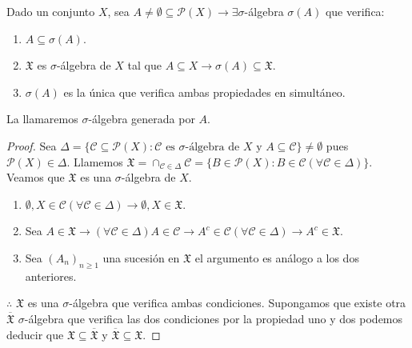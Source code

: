 \begin{prop}
    Dado un conjunto $X$, sea $A \neq \emptyset \subseteq \mathcal{P}(X) \to \exists \sigma$-álgebra $\sigma(A)$ que verifica: \begin{enumerate}
        \item $A \subseteq \sigma(A)$.
        \item $\mathfrak{X}$ es $\sigma$-álgebra de $X$ tal que $A \subseteq X \to \sigma(A) \subseteq \mathfrak{X}$.
        \item $\sigma(A)$ es la única que verifica ambas propiedades en simultáneo.
    \end{enumerate}
    La llamaremos $\sigma$-álgebra generada por $A$.

    \begin{proof}
        Sea $\Delta = \{ \mathscr{C} \subseteq \mathcal{P}(X) : \mathscr{C} \text{ es } \sigma \text{-álgebra de } X \text{ y } A \subseteq \mathscr{C} \} \neq \emptyset$ pues $\mathcal{P}(X) \in \Delta$.
        Llamemos $\mathfrak{X} = \cap_{\mathscr{C} \in \Delta} \mathscr{C} = \{ B \in \mathcal{P}(X) : B \in \mathscr{C} (\forall \mathscr{C} \in \Delta) \}$.
        Veamos que $\mathfrak{X}$ es una $\sigma$-álgebra de $X$.
        \begin{enumerate}
            \item $\emptyset, X \in \mathscr{C} (\forall \mathscr{C} \in \Delta) \to \emptyset, X \in \mathfrak{X}$.
            \item Sea $A \in \mathfrak{X} \to (\forall \mathscr{C} \in \Delta) A \in \mathscr{C} \to A^c \in \mathscr{C} (\forall \mathscr{C} \in \Delta) \to A^c \in \mathfrak{X}$.
            \item Sea $(A_n)_{n \geq 1}$ una sucesión en $\mathfrak{X}$ el argumento es análogo a los dos anteriores.
        \end{enumerate}
        $\therefore$ $\mathfrak{X}$ es una $\sigma$-álgebra que verifica ambas condiciones.
        Supongamos que existe otra $\overline{\mathfrak{X}}$ $\sigma$-álgebra que verifica las dos condiciones por la propiedad uno y dos podemos deducir que $\mathfrak{X} \subseteq \overline{\mathfrak{X}}$ y $\overline{\mathfrak{X}} \subseteq \mathfrak{X}$.
    \end{proof}
\end{prop}

